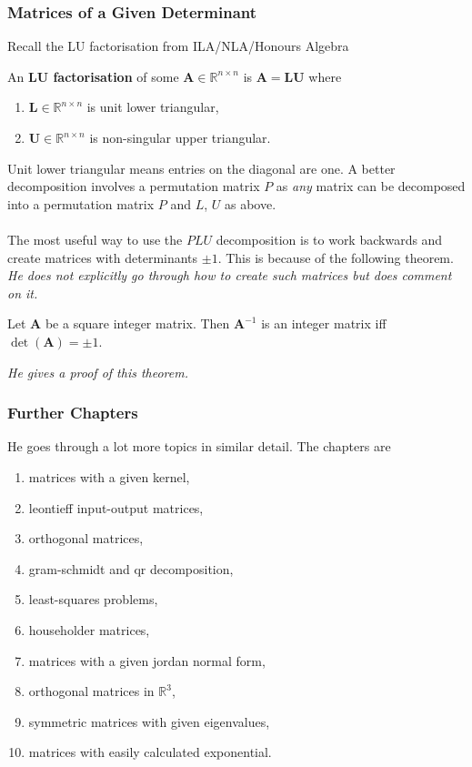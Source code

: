 \documentclass[12pt]{article}
\newcommand{\R}{\mathbb{R}}
\begin{document}
\subsubsection{Matrices of a Given Determinant}
Recall the LU factorisation from ILA/NLA/Honours Algebra
\begin{dfn}{}{}
An \textbf{LU factorisation} of some $\bm{A} \in \R^{n\times n}$ is $\bm{A} = \bm{LU}$ where
\begin{enumerate}[itemsep=-2mm]
    \item $\bm{L} \in \R^{n \times n}$ is unit lower triangular,
    \item $\bm{U} \in \R^{n \times n}$ is non-singular upper triangular.
\end{enumerate}
\end{dfn}
Unit lower triangular means entries on the diagonal are one. A better decomposition involves a permutation matrix $P$ as \textit{any} matrix can be decomposed into a permutation matrix $P$ and $L$, $U$ as above.\\\\
The most useful way to use the $PLU$ decomposition is to work backwards and create matrices with determinants $\pm1$. This is because of the following theorem. \textit{He does not explicitly go through how to create such matrices but does comment on it.}
\begin{thm}{}{}
Let $\mathbf{A}$ be a square integer matrix. Then $\mathbf{A}^{-1}$ is an integer matrix iff $\det(\mathbf{A}) = \pm1$.
\end{thm}
\textit{He gives a proof of this theorem.}

\subsubsection{Further Chapters}
He goes through a lot more topics in similar detail. The chapters are
\begin{enumerate}[itemsep=-2mm]
    \item matrices with a given kernel,
    \item leontieff input-output matrices,
    \item orthogonal matrices,
    \item gram-schmidt and qr decomposition,
    \item least-squares problems,
    \item householder matrices,
    \item matrices with a given jordan normal form,
    \item orthogonal matrices in $\R^3$,
    \item symmetric matrices with given eigenvalues,
    \item matrices with easily calculated exponential.
\end{enumerate}
\end{document}
